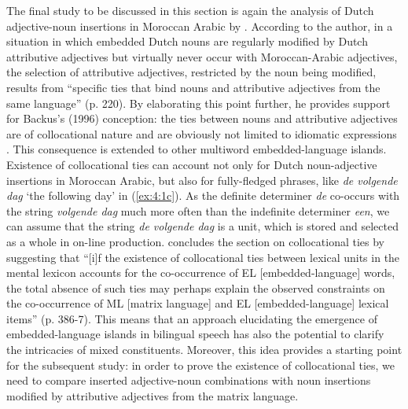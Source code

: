 The final study to be discussed in this section is again the analysis of Dutch adjective-noun insertions in Moroccan Arabic by \citet{boumans-syntax-1998}. According to the author, in a situation in which embedded Dutch nouns are regularly modified by Dutch attributive adjectives but virtually never occur with Moroccan-Arabic adjectives, the selection of attributive adjectives, restricted by the noun being modified, results from ``specific ties that bind nouns and attributive adjectives from the same language'' (p. 220). By elaborating this point further, he provides support for Backus's (1996) conception: the ties between nouns and attributive adjectives are of collocational nature and are obviously not limited to idiomatic expressions \citep[cf.][386-387]{boumans-syntax-1998}. This consequence is extended to other multiword embedded-language islands. Existence of collocational ties can account not only for Dutch noun-adjective insertions in Moroccan Arabic, but also for fully-fledged phrases, like \textit{de volgende dag} `the following day' in (\ref{ex:4:1c}). As the definite determiner \textit{de} co-occurs with the string \textit{volgende dag} much more often than the indefinite determiner \textit{een}, we can assume that the string \textit{de volgende dag} is a unit, which is stored and selected as a whole in on-line production. \citet{boumans-syntax-1998} concludes the section on collocational ties by suggesting that ``[i]f the existence of collocational ties between lexical units in the mental lexicon accounts for the co-occurrence of EL [embedded-language] words, the total absence of such ties may perhaps explain the observed constraints on the co-occurrence of ML [matrix language] and EL [embedded-language] lexical items'' (p. 386-7). This means that an approach elucidating the emergence of embedded-language islands in bilingual speech has also the potential to clarify the intricacies of mixed constituents. Moreover, this idea provides a starting point for the subsequent study: in order to prove the existence of collocational ties, we need to compare inserted adjective-noun combinations with noun insertions modified by attributive adjectives from the matrix language.

